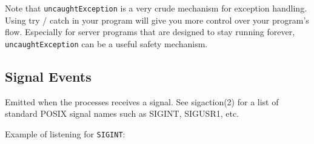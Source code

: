 \begin{Shaded}
\begin{Highlighting}[]
\NormalTok{(}\NormalTok{, } 
  \NormalTok{(} 
\NormalTok{\});}

 \NormalTok{() \{}
  \NormalTok{(}\NormalTok{);}
\NormalTok{\}, }\NormalTok{);}

\NormalTok{(}\NormalTok{);}
\end{Highlighting}
\end{Shaded}

Note that \texttt{uncaughtException} is a very crude mechanism for
exception handling. Using try / catch in your program will give you more
control over your program's flow. Especially for server programs that
are designed to stay running forever, \texttt{uncaughtException} can be
a useful safety mechanism.

\subsection{Signal Events}

Emitted when the processes receives a signal. See sigaction(2) for a
list of standard POSIX signal names such as SIGINT, SIGUSR1, etc.

Example of listening for \texttt{SIGINT}:

\begin{Shaded}
\begin{Highlighting}[]
\NormalTok{();}

\NormalTok{(}\NormalTok{, } \NormalTok{() \{}
  \NormalTok{(}\NormalTok{);}
\NormalTok{\});}
\end{Highlighting}
\end{Shaded}

